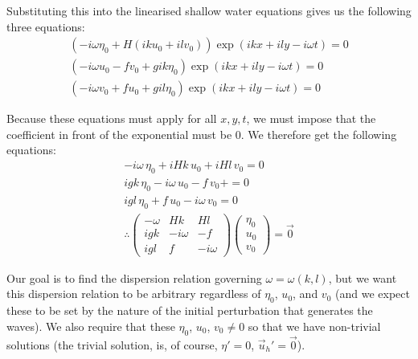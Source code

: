 Substituting this into the linearised shallow water equations gives us the following three equations:
\begin{align*}
    \left( -i\omega\eta_0 + H (iku_0+ilv_0) \right)\exp\left( ikx+ily-i\omega t \right)=0\\
    \left( -i\omega u_0-fv_0+gik\eta_0 \right)\exp\left( ikx+ily-i\omega t \right)=0\\
    \left( -i\omega v_0+fu_0+gil\eta_0 \right)\exp\left( ikx+ily-i\omega t \right)=0
\end{align*}

Because these equations must apply for all $x,y,t$, we must impose that the coefficient in front of the exponential must be $0$. We therefore get the following equations:
\begin{align*}
    -i\omega\,\eta_0 + iHk\,u_0+iHl\,v_0 =0
    \\
    igk\,\eta_0-i\omega\, u_0-f\,v_0+ =0
    \\
    igl\,\eta_0+f\,u_0-i\omega \,v_0=0
    \\
    \therefore
    \left( \begin{array}{ccc}
        -\omega & Hk & Hl \\
        igk & -i\omega & -f\\
        igl & f & -i\omega
    \end{array} \right)
    \left( \begin{array}{c}
        \eta_0\\
        u_0\\
        v_0
    \end{array} \right)
    =\vec{0}
\end{align*}

Our goal is to find the dispersion relation governing $\omega=\omega(k,l)$, but we want this dispersion relation to be arbitrary regardless of $\eta_0$, $u_0$, and $v_0$ (and we expect these to be set by the nature of the initial perturbation that generates the waves). We also require that these $\eta_0$, $u_0$, $v_0\neq 0$ so that we have non-trivial solutions (the trivial solution, is, of course, $\eta'=0$, $\vec{u}_h'=\vec{0}$).

